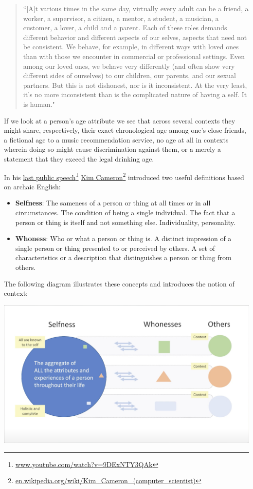 \documentclass[11pt, oneside]{article}   	%
\newcommand{\hyperfootnote}[1][]{\def\ArgI{{#1}}\hyperfootnoteRelay}
\newcommand\hyperfootnoteRelay[2][]{\href{#1#2}{\ArgI}\footnote{\href{#1#2}{#2}}}
\begin{document}
\begin{quote} ``[A]t various times in the same day, virtually every adult can be a friend, a worker, a supervisor, a citizen, a mentor, a student, a musician, a customer, a lover, a child and a parent. Each of these roles demands different behavior and different aspects of our selves, aspects that need not be consistent. We behave, for example, in different ways with loved ones than with those we encounter in commercial or professional settings. Even among our loved ones, we behave very differently (and often show very different sides of ourselves) to our children, our parents, and our sexual partners. But this is not dishonest, nor is it inconsistent. At the very least, it's no more inconsistent than is the complicated nature of having a self. It is human."\cite[p122]{Richards2021}
\end{quote}

If we look at a person's age attribute we see that across several contexts they might share, respectively, their exact chronological age among one's close friends, a fictional age to a music recommendation service, no age at all in contexts wherein doing so might cause discrimination against them, or a merely a statement that they exceed the legal drinking age. 

In his \hyperfootnote[last public speech][https://]{www.youtube.com/watch?v=9DExNTY3QAk}  
\hyperfootnote[Kim Cameron][https://]{en.wikipedia.org/wiki/Kim\_Cameron\_(computer\_scientist)} introduced two useful definitions based on archaic English:

\begin{itemize}
\item \textbf{Selfness}: The sameness of a person or thing at all times or in all circumstances. The condition of being a single individual. The fact that a person or thing is itself and not something else. Individuality, personality. 
\item \textbf{Whoness}: Who or what a person or thing is. A distinct impression of a single person or thing presented to or perceived by others. A set of characteristics or a description that distinguishes a person or thing from others. 
\end{itemize}

The following diagram illustrates these concepts and introduces the notion of context:

\includegraphics[width=\textwidth]{./images/selfness-and-whoness-larger.png}
\end{document}
